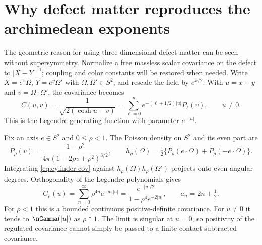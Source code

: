 \section{Why defect matter reproduces the archimedean exponents}\label{sec:free}

The geometric reason for using three-dimensional defect matter can be
seen without supersymmetry. Normalize a free massless scalar covariance
on the defect to $|X-Y|^{-1}$; coupling and color constants will be
restored when needed. Write $X=e^x\Omega$, $Y=e^y\Omega'$ with
$\Omega,\Omega'\in S^2$, and rescale the field by $e^{x/2}$. With
$u=x-y$ and $v=\Omega\cdot\Omega'$, the covariance becomes
\begin{equation}\label{eq:cylinder-cov}
 C(u,v)=\frac1{\sqrt{2(\cosh u-v)}}
 =\sum_{\ell=0}^\infty e^{-(\ell+1/2)|u|}P_\ell(v),\qquad u\ne0.
\end{equation}
This is the Legendre generating function with parameter $e^{-|u|}$.

Fix an axis $e\in S^2$ and $0\leq\rho<1$. The Poisson density on $S^2$
and its even part are
\begin{equation}
 P_\rho(v)=\frac{1-\rho^2}{4\pi(1-2\rho v+\rho^2)^{3/2}},\qquad
 h_\rho(\Omega)=\tfrac12\{P_\rho(e\cdot\Omega)+P_\rho(-e\cdot\Omega)\}.
\end{equation}
Integrating \eqref{eq:cylinder-cov} against $h_\rho(\Omega)h_\rho(\Omega')$
projects onto even angular degrees. Orthogonality of the Legendre
polynomials gives
\begin{equation}\label{eq:regulated-cov}
 C_\rho(u)=\sum_{n=0}^\infty\rho^{4n}e^{-a_n|u|}
 =\frac{e^{-|u|/2}}{1-\rho^4e^{-2|u|}},\qquad a_n=2n+\tfrac12.
\end{equation}
For $\rho<1$ this is a bounded continuous positive-definite covariance.
For $u\ne0$ it tends to $\nGamma(|u|)$ as $\rho\uparrow1$.
The limit is singular at $u=0$, so positivity of the regulated covariance
cannot simply be passed to a finite contact-subtracted covariance.

